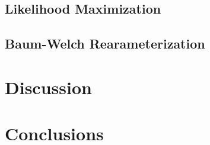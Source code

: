 \documentclass{article}
\begin{document}
\subsection{Likelihood Maximization}

\subsection{Baum-Welch Rearameterization}

\section{Discussion}

\section{Conclusions}

\appendix
\end{document}
